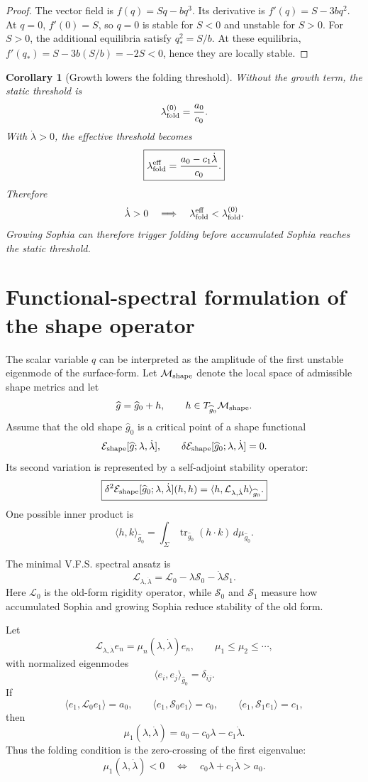 \documentclass[11pt,a4paper]{article}
\theoremstyle{plain}
\newtheorem{corollary}{Corollary}
\theoremstyle{remark}
\theoremstyle{definition}
\begin{document}
\begin{proof}
The vector field is $f(q)=S q-bq^3$. Its derivative is $f'(q)=S-3bq^2$.
At $q=0$, $f'(0)=S$, so $q=0$ is stable for $S<0$ and unstable for $S>0$.
For $S>0$, the additional equilibria satisfy $q_\ast^2=S/b$. At these equilibria,
$f'(q_\ast)=S-3b(S/b)=-2S<0$, hence they are locally stable.
\end{proof}

\begin{corollary}[Growth lowers the folding threshold]
Without the growth term, the static threshold is
\[
\lambda_{\rm fold}^{(0)}=\frac{a_0}{c_0}.
\]
With $\dot\lambda>0$, the effective threshold becomes
\[
\boxed{
\lambda_{\rm fold}^{\rm eff}
=
\frac{a_0-c_1\dot\lambda}{c_0}.
}
\]
Therefore
\[
\dot\lambda>0
\quad\Longrightarrow\quad
\lambda_{\rm fold}^{\rm eff}<\lambda_{\rm fold}^{(0)}.
\]
Growing Sophia can therefore trigger folding before accumulated Sophia reaches the static threshold.
\end{corollary}

\section{Functional-spectral formulation of the shape operator}
The scalar variable $q$ can be interpreted as the amplitude of the first unstable eigenmode of the
surface-form. Let $\mathcal M_{\rm shape}$ denote the local space of admissible shape metrics and let
\[
\widehat g=\widehat g_0+h,
\qquad
h\in T_{\widehat g_0}\mathcal M_{\rm shape}.
\]
Assume that the old shape $\widehat g_0$ is a critical point of a shape functional
\[
\mathcal E_{\rm shape}[\widehat g;\lambda,\dot\lambda],
\qquad
\delta\mathcal E_{\rm shape}[\widehat g_0;\lambda,\dot\lambda]=0.
\]
Its second variation is represented by a self-adjoint stability operator:
\[
\boxed{
\delta^2\mathcal E_{\rm shape}[\widehat g_0;\lambda,\dot\lambda](h,h)
=
\langle h,\mathcal L_{\lambda,\dot\lambda}h\rangle_{\widehat g_0}.
}
\]
One possible inner product is
\[
\langle h,k\rangle_{\widehat g_0}
=
\int_\Sigma \operatorname{tr}_{\widehat g_0}(h\cdot k)\,d\mu_{\widehat g_0}.
\]

The minimal V.F.S. spectral ansatz is
\[
\boxed{
\mathcal L_{\lambda,\dot\lambda}
=
\mathcal L_0-\lambda\mathcal S_0-\dot\lambda\mathcal S_1.
}
\]
Here $\mathcal L_0$ is the old-form rigidity operator, while $\mathcal S_0$ and $\mathcal S_1$
measure how accumulated Sophia and growing Sophia reduce stability of the old form.

Let
\[
\mathcal L_{\lambda,\dot\lambda}e_n
=
\mu_n(\lambda,\dot\lambda)e_n,
\qquad
\mu_1\le \mu_2\le\cdots,
\]
with normalized eigenmodes
\[
\langle e_i,e_j\rangle_{\widehat g_0}=\delta_{ij}.
\]
If
\[
\langle e_1,\mathcal L_0e_1\rangle=a_0,
\qquad
\langle e_1,\mathcal S_0e_1\rangle=c_0,
\qquad
\langle e_1,\mathcal S_1e_1\rangle=c_1,
\]
then
\[
\boxed{
\mu_1(\lambda,\dot\lambda)=a_0-c_0\lambda-c_1\dot\lambda.
}
\]
Thus the folding condition is the zero-crossing of the first eigenvalue:
\[
\boxed{
\mu_1(\lambda,\dot\lambda)<0
\quad\Longleftrightarrow\quad
c_0\lambda+c_1\dot\lambda>a_0.
}
\]
\end{document}
